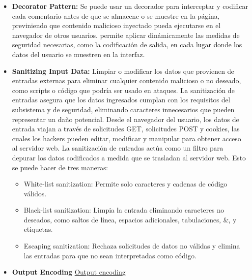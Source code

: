 \begin{itemize}

    \item \textbf{Decorator Pattern:} Se puede usar un decorador para interceptar y codificar cada comentario antes de que se almacene o se muestre en la página, previniendo que contenido malicioso inyectado pueda ejecutarse en el navegador de otros usuarios. permite aplicar dinámicamente las medidas de seguridad necesarias, como la codificación de salida, en cada lugar donde los datos del usuario se muestren en la interfaz.
    \item \textbf{Sanitizing Input Data:} Limpiar o modificar los datos que provienen de entradas externas para eliminar cualquier contenido malicioso o no deseado, como scripts o código que podría ser usado en ataques.
    La sanitización de entradas asegura que los datos ingresados cumplan con los requisitos del subsistema y de seguridad, eliminando caracteres innecesarios que pueden representar un daño potencial. Desde el navegador del usuario, los datos de entrada viajan a través de solicitudes GET, solicitudes POST y cookies, las cuales los hackers pueden editar, modificar y manipular para obtener acceso al servidor web. La sanitización de entradas actúa como un filtro para depurar los datos codificados a medida que se trasladan al servidor web. Esto se puede hacer de tres maneras:

    \begin{itemize}
        \item White-list sanitization: Permite solo caracteres y cadenas de código válidos.
        \item Black-list sanitization: Limpia la entrada eliminando caracteres no deseados, como saltos de línea, espacios adicionales, tabulaciones, \&, y etiquetas.
        \item Escaping sanitization: Rechaza solicitudes de datos no válidas y elimina las entradas para que no sean interpretadas como código.   
    \end{itemize}
    \item \textbf{Output Encoding} 
    \href{https://docs.oracle.com/en/cloud/saas/marketing/responsys-user/OutputEncodingRequiredFields.html}{Output encoding}

\end{itemize}